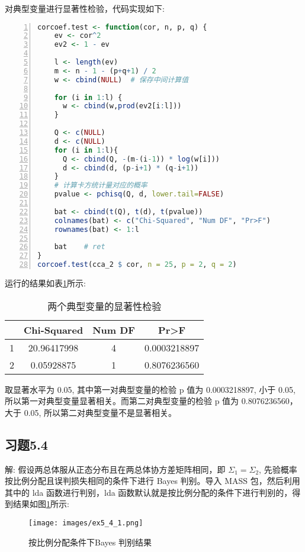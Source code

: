 \documentclass{ctexrep}
\begin{document}
对典型变量进行显著性检验，代码实现如下:
\begin{lstlisting}[language=R, numbers=left, numberstyle=\tiny]
corcoef.test <- function(cor, n, p, q) {
    ev <- cor^2
    ev2 <- 1 - ev
    
    l <- length(ev)
    m <- n - 1 - (p+q+1) / 2
    w <- cbind(NULL)  # 保存中间计算值

    for (i in 1:l) {
      w <- cbind(w,prod(ev2[i:l]))
    }

    Q <- c(NULL)
    d <- c(NULL)
    for (i in 1:l){
      Q <- cbind(Q, -(m-(i-1)) * log(w[i]))
      d <- cbind(d, (p-i+1) * (q-i+1))
    }
    # 计算卡方统计量对应的概率
    pvalue <- pchisq(Q, d, lower.tail=FALSE)
    
    bat <- cbind(t(Q), t(d), t(pvalue))
    colnames(bat) <- c("Chi-Squared", "Num DF", "Pr>F")
    rownames(bat) <- 1:l
    
    bat    # ret
}
corcoef.test(cca_2 $ cor, n = 25, p = 2, q = 2)
\end{lstlisting}
运行的结果如表\ref{tab:ex491}所示:
\begin{table}[h!]
\begin{center}
\begin{tabular}{c|ccc}
 & Chi-Squared & Num DF & Pr>F \\
\hline
1 & 20.96417998 & 4 & 0.0003218897 \\
2 & 0.05928875 & 1 & 0.8076236560
\end{tabular}
\end{center}
\caption{两个典型变量的显著性检验}
\label{tab:ex491}
\end{table}

取显著水平为 0.05, 其中第一对典型变量的检验 p 值为 0.0003218897, 小于 0.05, 所以第一对典型变量显著相关。而第二对典型变量的检验 p 值为 0.8076236560，大于 0.05, 所以第二对典型变量不是显著相关。

\subsection*{习题5.4}
解: 假设两总体服从正态分布且在两总体协方差矩阵相同，即 $\Sigma_1=\Sigma_2$, 先验概率按比例分配且误判损失相同的条件下进行 Bayes 判别。导入 MASS 包，然后利用其中的 lda 函数进行判别，lda 函数默认就是按比例分配的条件下进行判别的，得到结果如图\ref{fig:ex541}所示:
\begin{figure}[ht!]
\begin{center}
\texttt{[image: images/ex5\_4\_1.png]}
\end{center}
\caption{按比例分配条件下Bayes 判别结果}
\label{fig:ex541}
\end{figure}
\end{document}
